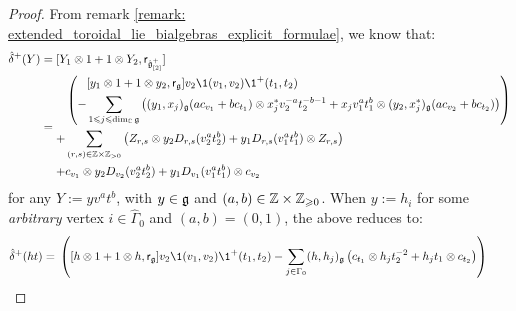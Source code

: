 \begin{proof}
                    From remark \ref{remark: extended_toroidal_lie_bialgebras_explicit_formulae}, we know that:
                        $$
                            \begin{aligned}
                                \hat{\delta}^+(Y) & = [Y_1 \tensor 1 + 1 \tensor Y_2, \sfr_{ \hat{\g}_{[2]}^+ }]
                                \\
                                & = 
                                \begin{aligned}
                                    & \left( \begin{aligned}
                                        & [y_1 \tensor 1 + 1 \tensor y_2, \sfr_{\g}] v_2 \1(v_1, v_2) \1^+(t_1, t_2)
                                        \\
                                        - & \sum_{1 \leq j \leq \dim_{\bbC} \g} \left( (y_1, x_j)_{\g} ( a c_{v_1} + b c_{t_1} ) \tensor x_j^* v_2^{-a} t_2^{-b - 1} + x_j v_1^a t_1^b \tensor (y_2, x_j^*)_{\g} ( a c_{v_2} + b c_{t_2} ) \right)
                                    \end{aligned}
                                    \right)
                                    \\
                                    + & \sum_{(r, s) \in \Z \x \Z_{> 0}} \left( Z_{r, s} \tensor y_2 D_{r, s}(v_2^a t_2^b) + y_1 D_{r, s}(v_1^a t_1^b) \tensor Z_{r, s} \right)
                                    \\
                                    + & c_{v_1} \tensor y_2 D_{v_2}(v_2^a t_2^b) + y_1 D_{v_1}(v_1^a t_1^b) \tensor c_{v_2}
                                \end{aligned}
                            \end{aligned}
                        $$
                    for any $Y := y v^a t^b$, with $y \in \g$ and $(a, b) \in \Z \x \Z_{\geq 0}$. When $y := h_i$ for some \textit{arbitrary} vertex $i \in \hat{\Gamma}_0$ and $(a, b) = (0, 1)$, the above reduces to:
                        $$
                            \begin{aligned}
                                \hat{\delta}^+(h t) & =
                                \begin{aligned}
                                    & \left( [h \tensor 1 + 1 \tensor h, \sfr_{\g}] v_2 \1(v_1, v_2) \1^+(t_1, t_2) - \sum_{j \in \Gamma_0} (h, h_j)_{\g} \left( c_{t_1} \tensor h_j t_2^{-2} + h_j t_1 \tensor c_{t_2} \right)
                                    \right)

\end{aligned}
\end{aligned}$$
\end{proof}
